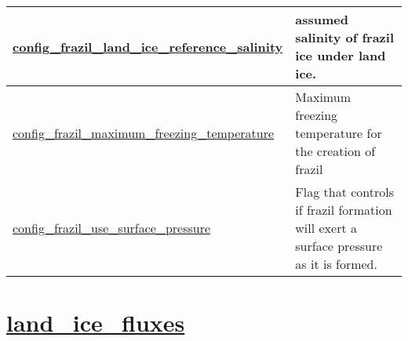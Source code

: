 {\begin{center}
\begin{longtable}{| p{2.0in} || p{4.0in} |}
    \hline
    \hyperref[subsec:nm_sec_config_frazil_land_ice_reference_salinity]{config\_frazil\_land\_ice\_\-reference\_salinity} & assumed salinity of frazil ice under land ice. \\
    \hline
    \hyperref[subsec:nm_sec_config_frazil_maximum_freezing_temperature]{config\_frazil\_maximum\_\-freezing\_temperature} & Maximum freezing temperature for the creation of frazil \\
    \hline
    \hyperref[subsec:nm_sec_config_frazil_use_surface_pressure]{config\_frazil\_use\_surface\_\-pressure} & Flag that controls if frazil formation will exert a surface pressure as it is formed. \\
    \hline
\end{longtable}
\end{center}
}
\section[land\_ice\_fluxes]{\hyperref[sec:nm_sec_land_ice_fluxes]{land\_ice\_fluxes}}
\label{sec:nm_tab_land_ice_fluxes}

\vspace{0.5in}
